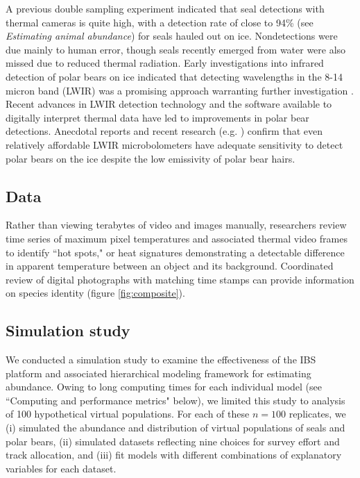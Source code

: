 \documentclass[]{rsos}%
\begin{document}
A previous double sampling experiment \cite{ConnEtAl2014} indicated that seal detections with thermal cameras is quite high, with a detection rate of close to 94\% (see \textit{Estimating animal abundance}) for seals hauled out on ice.  Nondetections were due mainly to human error, though seals recently emerged from water were also missed due to reduced thermal radiation.  Early investigations into infrared detection of polar bears on ice indicated that detecting wavelengths in the 8-14 micron band (LWIR) was a promising approach warranting further investigation \cite{Brooks1972}. Recent advances in LWIR detection technology and the software available to digitally interpret thermal data have led to improvements in polar bear detections. Anecdotal reports and recent research (e.g. \cite{ZitterbartEtAl2015}) confirm that even relatively affordable LWIR microbolometers have adequate sensitivity to detect polar bears on the ice despite the low emissivity \cite{PreciadoEtAl2002} of polar bear hairs.


\subsection{Data}

Rather than viewing terabytes of video and images manually, researchers review time series of maximum pixel temperatures and associated thermal video frames to identify ``hot spots," or heat signatures demonstrating a detectable difference in apparent temperature between an object and its background.  Coordinated review of digital photographs with matching time stamps can provide information on species identity (figure \ref{fig:composite}).

\subsection{Simulation study}

We conducted a simulation study to examine the effectiveness of the IBS platform and associated hierarchical modeling framework for estimating abundance.  Owing to long computing times for each individual model (see ``Computing and performance metrics" below), we limited this study to analysis of 100 hypothetical virtual populations.  For each of these $n=100$ replicates, we (i) simulated the abundance and distribution of virtual populations of seals and polar bears, (ii) simulated datasets reflecting nine choices for survey effort and track allocation, and (iii) fit models with different combinations of explanatory variables for each dataset.
\end{document}
